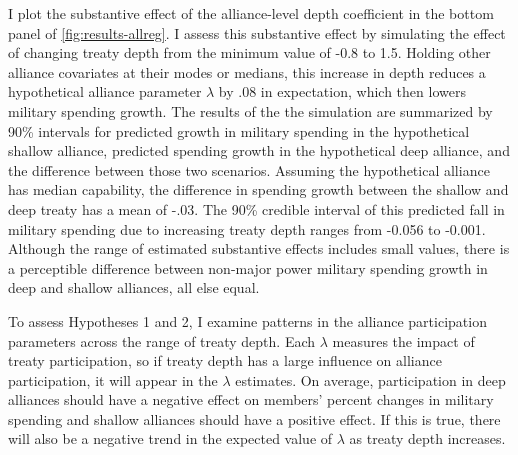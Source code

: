 \documentclass[12pt]{article}
\begin{document}
I plot the substantive effect of the alliance-level depth coefficient in the bottom panel of \autoref{fig:results-allreg}. 
I assess this substantive effect by simulating the effect of changing treaty depth from the minimum value of -0.8 to 1.5. 
Holding other alliance covariates at their modes or medians, this increase in depth reduces a hypothetical alliance parameter $\lambda$ by .08 in expectation, which then lowers military spending growth.
The results of the the simulation are summarized by 90\% intervals for predicted growth in military spending in the hypothetical shallow alliance, predicted spending growth in the hypothetical deep alliance, and the difference between those two scenarios.
Assuming the hypothetical alliance has median capability, the difference in spending growth between the shallow and deep treaty has a mean of -.03.
The 90\% credible interval of this predicted fall in military spending due to increasing treaty depth ranges from -0.056 to -0.001.
Although the range of estimated substantive effects includes small values, there is a perceptible difference between non-major power military spending growth in deep and shallow alliances, all else equal.  


To assess Hypotheses 1 and 2, I examine patterns in the alliance participation parameters across the range of treaty depth.
Each $\lambda$ measures the impact of treaty participation, so if treaty depth has a large influence on alliance participation, it will appear in the $\lambda$ estimates. 
On average, participation in deep alliances should have a negative effect on members' percent changes in military spending and shallow alliances should have a positive effect.
If this is true, there will also be a negative trend in the expected value of $\lambda$ as treaty depth increases.
\end{document}
